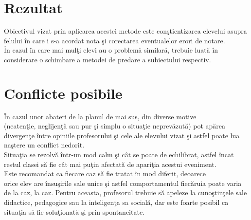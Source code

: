 \documentclass{article}
\begin{document}

\section{Rezultat}

Obiectivul vizat prin aplicarea acestei metode este con\c stientizarea elevelui asupra felului \^ in care i s-a acordat nota \c si corectarea eventualelor erori de notare.\\
\^ In cazul \^ in care mai mul\c ti elevi au o problem\u a similar\u a, trebuie luat\u a \^ in \\
considerare o schimbare a metodei de predare a subiectului respectiv.\\


\section{Conflicte posibile}

\^ In cazul unor abateri de la planul de mai sus, din diverse motive\\(neaten\c tie, neglijen\c t\u a sau pur \c si simplu o situa\c tie neprev\u azut\u a) pot ap\u area divergen\c te \^ intre opiniile profesorului \c si cele ale elevului vizat \c si astfel poate lua na\c stere un conflict nedorit. \\ Situa\c tia se rezolv\u a \^ intr-un mod calm \c si c\^ at se poate de echilibrat, astfel \^ incat restul clasei s\u a fie c\^ at mai pu\c tin afectat\u a de apari\c tia acestui eveniment.\\
Este recomandat ca fiecare caz s\u a fie tratat \^ in mod diferit, deoarece\\ orice elev are \^ insu\c sirile sale unice \c si astfel comportamentul fiec\u aruia poate varia de la caz, la caz. Pentru aceasta, profesorul trebuie s\u a apeleze la cuno\c stin\c tele sale didactice, pedagogice sau la inteligen\c ta sa social\u a, dar este foarte posibil ca situa\c tia s\u a fie solu\c tionat\u a \c si prin spontaneitate.
\end{document}
